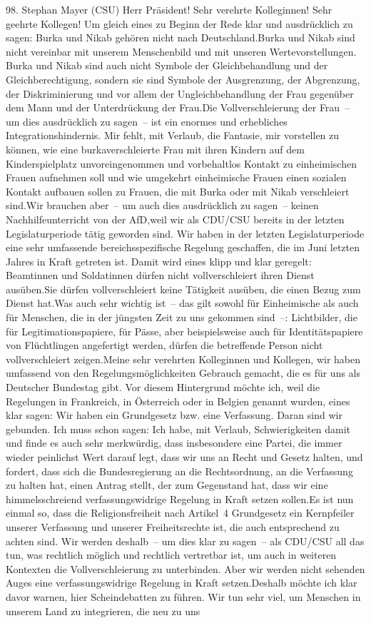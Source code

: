 \documentclass{article}
\begin{document}
	98. Stephan Mayer (CSU) Herr Präsident! Sehr verehrte Kolleginnen! Sehr geehrte Kollegen! Um gleich eines zu Beginn der Rede klar und ausdrücklich zu sagen: Burka und Nikab gehören nicht nach Deutschland.Burka und Nikab sind nicht vereinbar mit unserem Menschenbild und mit unseren Wertevorstellungen. Burka und Nikab sind auch nicht Symbole der Gleichbehandlung und der Gleichberechtigung, sondern sie sind Symbole der Ausgrenzung, der Abgrenzung, der Diskriminierung und vor allem der Ungleichbehandlung der Frau gegenüber dem Mann und der Unterdrückung der Frau.Die Vollverschleierung der Frau – um dies ausdrücklich zu sagen – ist ein enormes und erhebliches Integrationshindernis. Mir fehlt, mit Verlaub, die Fantasie, mir vorstellen zu können, wie eine burkaverschleierte Frau mit ihren Kindern auf dem Kinderspielplatz unvoreingenommen und vorbehaltlos Kontakt zu einheimischen Frauen aufnehmen soll und wie umgekehrt einheimische Frauen einen sozialen Kontakt aufbauen sollen zu Frauen, die mit Burka oder mit Nikab verschleiert sind.Wir brauchen aber – um auch dies ausdrücklich zu sagen – keinen Nachhilfeunterricht von der AfD,weil wir als CDU/CSU bereits in der letzten Legislaturperiode tätig geworden sind. Wir haben in der letzten Legislaturperiode eine sehr umfassende bereichsspezifische Regelung geschaffen, die im Juni letzten Jahres in Kraft getreten ist. Damit wird eines klipp und klar geregelt: Beamtinnen und Soldatinnen dürfen nicht vollverschleiert ihren Dienst ausüben.Sie dürfen vollverschleiert keine Tätigkeit ausüben, die einen Bezug zum Dienst hat.Was auch sehr wichtig ist – das gilt sowohl für Einheimische als auch für Menschen, die in der jüngsten Zeit zu uns gekommen sind –: Lichtbilder, die für Legitimationspapiere, für Pässe, aber beispielsweise auch für Identitätspapiere von Flüchtlingen angefertigt werden, dürfen die betreffende Person nicht vollverschleiert zeigen.Meine sehr verehrten Kolleginnen und Kollegen, wir haben umfassend von den Regelungsmöglichkeiten Gebrauch gemacht, die es für uns als Deutscher Bundestag gibt. Vor diesem Hintergrund möchte ich, weil die Regelungen in Frankreich, in Österreich oder in Belgien genannt wurden, eines klar sagen: Wir haben ein Grundgesetz bzw. eine Verfassung. Daran sind wir gebunden. Ich muss schon sagen: Ich habe, mit Verlaub, Schwierigkeiten damit und finde es auch sehr merkwürdig, dass insbesondere eine Partei, die immer wieder peinlichst Wert darauf legt, dass wir uns an Recht und Gesetz halten, und fordert, dass sich die Bundesregierung an die Rechtsordnung, an die Verfassung zu halten hat, einen Antrag stellt, der zum Gegenstand hat, dass wir eine himmelsschreiend verfassungswidrige Regelung in Kraft setzen sollen.Es ist nun einmal so, dass die Religionsfreiheit nach Artikel 4 Grundgesetz ein Kernpfeiler unserer Verfassung und unserer Freiheitsrechte ist, die auch entsprechend zu achten sind. Wir werden deshalb – um dies klar zu sagen – als CDU/CSU all das tun, was rechtlich möglich und rechtlich vertretbar ist, um auch in weiteren Kontexten die Vollverschleierung zu unterbinden. Aber wir werden nicht sehenden Auges eine verfassungswidrige Regelung in Kraft setzen.Deshalb möchte ich klar davor warnen, hier Scheindebatten zu führen. Wir tun sehr viel, um Menschen in unserem Land zu integrieren, die neu zu uns 
\end{document}
